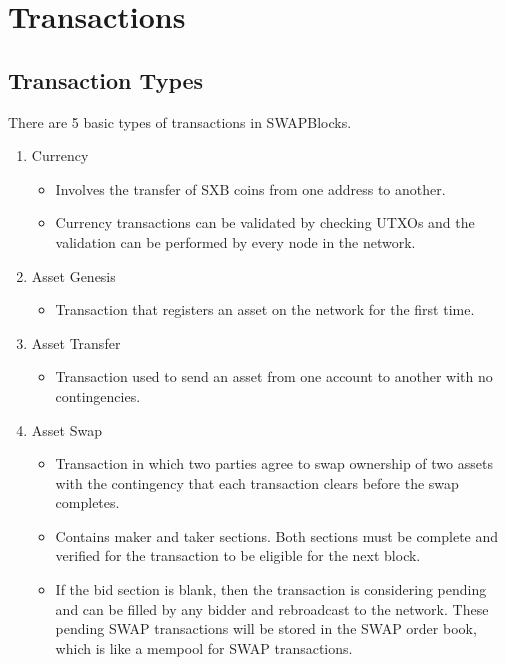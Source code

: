 \documentclass[12pt]{article}
\begin{document}


\section{Transactions}

\subsection{Transaction Types}
There are 5 basic types of transactions in SWAPBlocks.

\begin{enumerate}
	\item Currency
		\begin{itemize}
			\item{Involves the transfer of SXB coins from one address to another.}
			\item{Currency transactions can be validated by checking UTXOs and the
				validation can be performed by every node in the network.}
		\end{itemize}
	\item Asset Genesis
		\begin{itemize}
			\item{Transaction that registers an asset on the network for the first time.}
		\end{itemize}
	\item Asset Transfer
		\begin{itemize}
			\item{Transaction used to send an asset from one account to another
				with no contingencies.}
		\end{itemize}
	\item Asset Swap
		\begin{itemize}
			\item{Transaction in which two parties agree to swap 
				ownership of two assets with the contingency that 
				each transaction clears before the swap completes.}
			\item{Contains maker and taker sections. Both sections must
				be complete and verified for the transaction to be eligible for
				the next block.}
			\item{If the bid section is blank, then the transaction is considering pending and can
				be filled by any bidder and rebroadcast to the network. These pending SWAP transactions
				will be stored in the SWAP order book, which is like a mempool for SWAP transactions.} 
		\end{itemize}

\end{enumerate}
\end{document}
